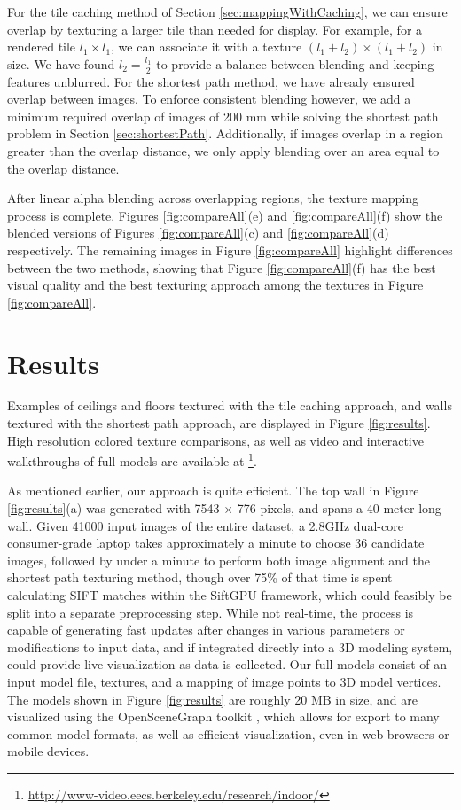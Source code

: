 \documentclass[]{spie}  %
\begin{document}
For the tile caching method of Section \ref{sec:mappingWithCaching},
we can ensure overlap by texturing a larger tile than needed for
display. For example, for a rendered tile $l_1 \times l_1$, we can
associate it with a texture $(l_1 + l_2) \times (l_1 + l_2)$ in size.
We have found $l_2 = \frac{l_1}{2}$ to provide a balance between
blending and keeping features unblurred. For the shortest path method,
we have already ensured overlap between images. To enforce consistent
blending however, we add a minimum required overlap of images of 200
mm while solving the shortest path problem in Section
\ref{sec:shortestPath}. Additionally, if images overlap in a region
greater than the overlap distance, we only apply blending over an area
equal to the overlap distance.

After linear alpha blending across overlapping regions, the texture
mapping process is complete. Figures \ref{fig:compareAll}(e) and
\ref{fig:compareAll}(f) show the blended versions of Figures
\ref{fig:compareAll}(c) and \ref{fig:compareAll}(d) respectively. The
remaining images in Figure \ref{fig:compareAll} highlight differences
between the two methods, showing that Figure \ref{fig:compareAll}(f)
has the best visual quality and the best texturing approach among the
textures in Figure \ref{fig:compareAll}.

\section{Results}
\label{sec:results}
Examples of ceilings and floors textured with the tile caching
approach, and walls textured with the shortest path approach, are
displayed in Figure \ref{fig:results}. High resolution colored texture
comparisons, as well as video and interactive walkthroughs of full
models are available at
\footnote{\url{http://www-video.eecs.berkeley.edu/research/indoor/}}.

As mentioned earlier, our approach is quite efficient. The top wall in
Figure \ref{fig:results}(a) was generated with 7543 $\times$ 776
pixels, and spans a 40-meter long wall. Given 41000 input images of
the entire dataset, a 2.8GHz dual-core consumer-grade laptop takes
approximately a minute to choose 36 candidate images, followed by
under a minute to perform both image alignment and the shortest path
texturing method, though over 75\% of that time is spent calculating
SIFT matches within the SiftGPU framework, which could feasibly be
split into a separate preprocessing step. While not real-time, the
process is capable of generating fast updates after changes in various
parameters or modifications to input data, and if integrated directly
into a 3D modeling system, could provide live visualization as data is
collected. Our full models consist of an input model file, textures,
and a mapping of image points to 3D model vertices. The models shown
in Figure \ref{fig:results} are roughly 20 MB in size, and are
visualized using the OpenSceneGraph toolkit \cite{openscenegraph},
which allows for export to many common model formats, as well as
efficient visualization, even in web browsers or mobile devices.
\end{document}
